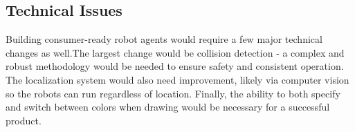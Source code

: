 \subsection{Technical Issues}
Building consumer-ready robot agents would require a few major technical changes as well.The largest change would be collision detection - a complex and robust methodology would be needed to ensure safety and consistent operation. The localization system would also need improvement, likely via computer vision so the robots can run regardless of location. Finally, the ability to both specify and switch between colors when drawing would be necessary for a successful product.
